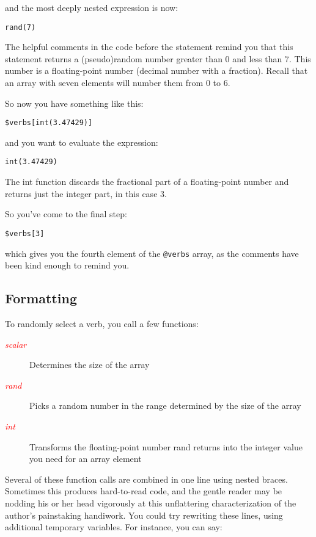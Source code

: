and the most deeply nested expression is now:

\begin{lstlisting}
rand(7)
\end{lstlisting}

The helpful comments in the code before the statement remind you that this statement returns a (pseudo)random number greater than 0 and less than 7. This number is a floating-point number (decimal number with a fraction). Recall that an array with seven elements will number them from 0 to 6.

So now you have something like this:

\begin{lstlisting}
$verbs[int(3.47429)] 
\end{lstlisting}

and you want to evaluate the expression:

\begin{lstlisting}
int(3.47429) 
\end{lstlisting}

The int function discards the fractional part of a floating-point number and returns just the integer part, in this case 3.

So you've come to the final step:

\begin{lstlisting}
$verbs[3]
\end{lstlisting}

which gives you the fourth element of the \verb|@verbs| array, as the comments have been kind enough to remind you. 

\subsection{Formatting}
To randomly select a verb, you call a few functions: 

\begin{description}
  \item[\textcolor{red}{\textit{scalar}}] Determines the size of the array 
  \item[\textcolor{red}{\textit{rand}}] Picks a random number in the range determined by the size of the array 
  \item[\textcolor{red}{\textit{int}}] Transforms the floating-point number rand returns into the integer value you need for an array element 
\end{description}

Several of these function calls are combined in one line using nested braces. Sometimes this produces hard-to-read code, and the gentle reader may be nodding his or her head vigorously at this unflattering characterization of the author's painstaking handiwork. You could try rewriting these lines, using additional temporary variables. For instance, you can say:

